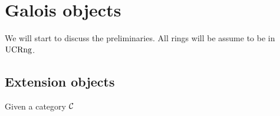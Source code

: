 \section{Galois objects}
We will start to discuss the preliminaries. All rings will be assume to be in $\mathrm{UCRng}$.

\subsection{Extension objects}
Given a category $\mathcal{C}$